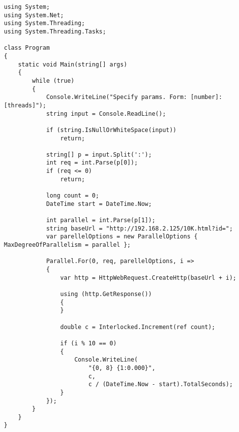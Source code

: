 \begin{verbatim}
using System;
using System.Net;
using System.Threading;
using System.Threading.Tasks;

class Program
{
    static void Main(string[] args)
    {
        while (true)
        {
            Console.WriteLine("Specify params. Form: [number]:[threads]");
            string input = Console.ReadLine();

            if (string.IsNullOrWhiteSpace(input))
                return;

            string[] p = input.Split(':');
            int req = int.Parse(p[0]);
            if (req <= 0)
                return;

            long count = 0;
            DateTime start = DateTime.Now;

            int parallel = int.Parse(p[1]);
            string baseUrl = "http://192.168.2.125/10K.html?id=";
            var parellelOptions = new ParallelOptions { MaxDegreeOfParallelism = parallel };

            Parallel.For(0, req, parellelOptions, i =>
            {
                var http = HttpWebRequest.CreateHttp(baseUrl + i);
                    
                using (http.GetResponse())
                {
                }

                double c = Interlocked.Increment(ref count);

                if (i % 10 == 0)
                {
                    Console.WriteLine(
                        "{0, 8} {1:0.000}", 
                        c, 
                        c / (DateTime.Now - start).TotalSeconds);
                }
            });
        }
    }
}
\end{verbatim}


